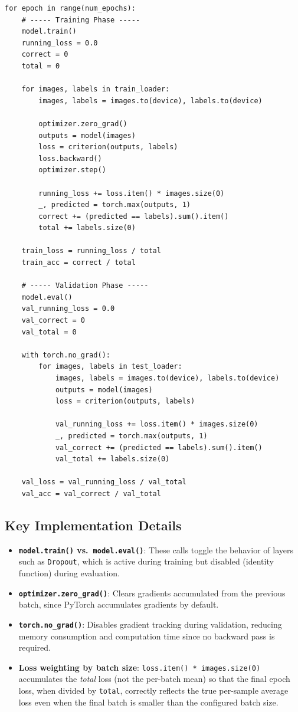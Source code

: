\documentclass[12pt,a4paper]{report}
\begin{document}
\begin{lstlisting}[caption={Training and validation loop}, label={lst:trainloop}]
for epoch in range(num_epochs):
    # ----- Training Phase -----
    model.train()
    running_loss = 0.0
    correct = 0
    total = 0

    for images, labels in train_loader:
        images, labels = images.to(device), labels.to(device)

        optimizer.zero_grad()
        outputs = model(images)
        loss = criterion(outputs, labels)
        loss.backward()
        optimizer.step()

        running_loss += loss.item() * images.size(0)
        _, predicted = torch.max(outputs, 1)
        correct += (predicted == labels).sum().item()
        total += labels.size(0)

    train_loss = running_loss / total
    train_acc = correct / total

    # ----- Validation Phase -----
    model.eval()
    val_running_loss = 0.0
    val_correct = 0
    val_total = 0

    with torch.no_grad():
        for images, labels in test_loader:
            images, labels = images.to(device), labels.to(device)
            outputs = model(images)
            loss = criterion(outputs, labels)

            val_running_loss += loss.item() * images.size(0)
            _, predicted = torch.max(outputs, 1)
            val_correct += (predicted == labels).sum().item()
            val_total += labels.size(0)

    val_loss = val_running_loss / val_total
    val_acc = val_correct / val_total
\end{lstlisting}

\subsection{Key Implementation Details}
\begin{itemize}
    \item \textbf{\texttt{model.train()} vs.\ \texttt{model.eval()}}: These calls toggle the behavior of layers such as \texttt{Dropout}, which is active during training but disabled (identity function) during evaluation.
    \item \textbf{\texttt{optimizer.zero\_grad()}}: Clears gradients accumulated from the previous batch, since PyTorch accumulates gradients by default.
    \item \textbf{\texttt{torch.no\_grad()}}: Disables gradient tracking during validation, reducing memory consumption and computation time since no backward pass is required.
    \item \textbf{Loss weighting by batch size}: \texttt{loss.item() * images.size(0)} accumulates the \emph{total} loss (not the per-batch mean) so that the final epoch loss, when divided by \texttt{total}, correctly reflects the true per-sample average loss even when the final batch is smaller than the configured batch size.
\end{itemize}
\end{document}
